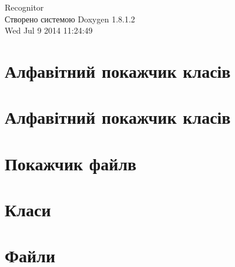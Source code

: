 \documentclass{book}
\begin{document}
\hypersetup{pageanchor=false,citecolor=blue}
\begin{titlepage}
\vspace*{7cm}
\begin{center}
{\Large Recognitor }\\
\vspace*{1cm}
{\large Створено системою Doxygen 1.8.1.2}\\
\vspace*{0.5cm}
{\small Wed Jul 9 2014 11:24:49}\\
\end{center}
\end{titlepage}
\clearemptydoublepage
{}
\tableofcontents
\clearemptydoublepage
{}
\hypersetup{pageanchor=true,citecolor=blue}
\chapter{Алфавітний покажчик класів}

\chapter{Алфавітний покажчик класів}

\chapter{Покажчик файлв}

\chapter{Класи}


















\chapter{Файли}



















\printindex
\end{document}
